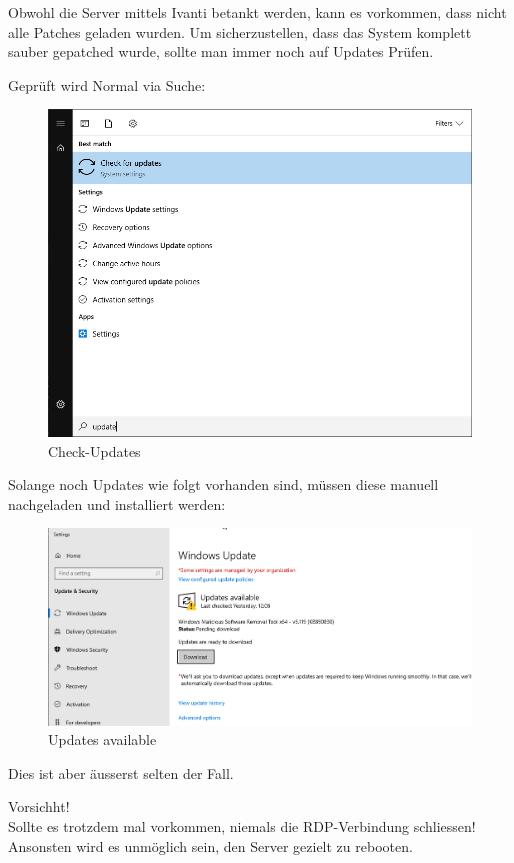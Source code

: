 \begin{flushleft}
    Obwohl die Server mittels \Gls{Ivanti} betankt werden, kann es vorkommen, dass nicht alle Patches geladen wurden.
    Um sicherzustellen, dass das System komplett sauber gepatched wurde, sollte man immer noch auf Updates Prüfen.

    Geprüft wird Normal via Suche:
    \begin{figure}[H]
        \centering
        \includegraphics[width=1\linewidth]{source/general/search_for_updates}
        \caption{Check-Updates}
        \label{fig:check-updates}
    \end{figure}

    Solange noch Updates wie folgt vorhanden sind, müssen diese manuell nachgeladen und installiert werden:
    \begin{figure}[H]
        \centering
        \includegraphics[width=1\linewidth]{source/general/updates_available}
        \caption{Updates available}
        \label{fig:updates-available}
    \end{figure}

    Dies ist aber äusserst selten der Fall.

    \begin{mdframed}
    Vorsichht!\\Sollte es trotzdem mal vorkommen, niemals die \Gls{RDP}-Verbindung schliessen!\\Ansonsten wird es unmöglich sein, den Server gezielt zu rebooten.
    \end{mdframed}

\end{flushleft}